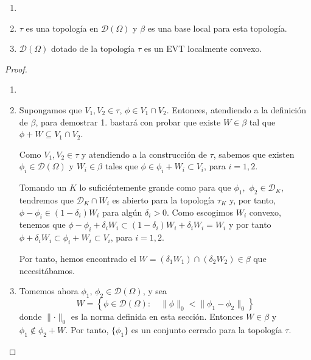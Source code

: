 \begin{teorema}
\begin{enumerate}
\item[]
\item $\tau$ es una topología en $ \mathcal{D}(\Omega)$ y $\beta$ es una base local para esta topología.
\item  $ \mathcal{D}(\Omega)$  dotado de la topología $\tau$ es un EVT localmente convexo.
\end{enumerate}
\end{teorema}
\begin{proof}

\begin{enumerate}

\item[]
\item Supongamos que $V_{1},V_{2}\in
\tau$, $\phi\in V_{1}\cap V_{2}$. Entonces, atendiendo a la definición de $\beta$, para demostrar 1. bastará con probar que existe $W\in\beta$ tal que $\phi + W \subseteq V_{1}\cap V_{2}$. 

Como $V_{1},V_{2}\in
\tau$ y atendiendo a la construcción de $\tau$, sabemos que existen $\phi_{i}\in\mathcal{D}(\Omega )$ y $W_{i} \in \beta$ tales que $\phi\in \phi_{i} + W_{i} \subset V_{i}$, para $i=1,2$.

Tomando un $K$ lo suficiéntemente grande como para que $\phi_{1},$ $\phi_{2}\in \mathcal{D}_{K}$, tendremos que $\mathcal{D}_{K}\cap W_{i}$ es abierto para la topología $\tau_{K}$ y, por tanto, $\phi-\phi_{i} \in (1-\delta_{i})W_{i}$ para algún $\delta_{i}>0$. Como escogimos $W_{i}$ convexo, tenemos que $\phi-\phi_{i} + \delta_{i} W_{i} \subset (1-\delta_{i})W_{i} + \delta_{i} W_{i} = W_{i} $ y por tanto $\phi + \delta_{i} W_{i} \subset \phi_{i} + W_{i} \subset V_{i}$, para $i=1,2$. 

Por tanto, hemos encontrado el $W = (\delta_{1} W_{1}) \cap (\delta_{2} W_{2})\in \beta$ que necesitábamos. 

\item Tomemos ahora $\phi_{1}$, $\phi_{2}\in \mathcal{D}(\Omega)$, y sea 
\begin{equation}
W = \left\{ \phi\in\mathcal{D}(\Omega) : \quad \parallel \phi\parallel_{0} < \parallel \phi_{1}-\phi_{2}\parallel_{0} \right\}
\end{equation} 
donde $\parallel \cdot \parallel_{0} $ es la norma definida en esta sección. Entonces $W\in\beta $ y $\phi_{1}\notin \phi_{2} + W$. Por tanto, $\{\phi_{1}\}$ es un conjunto cerrado para la topología $\tau$. 


\end{enumerate}
\end{proof}
